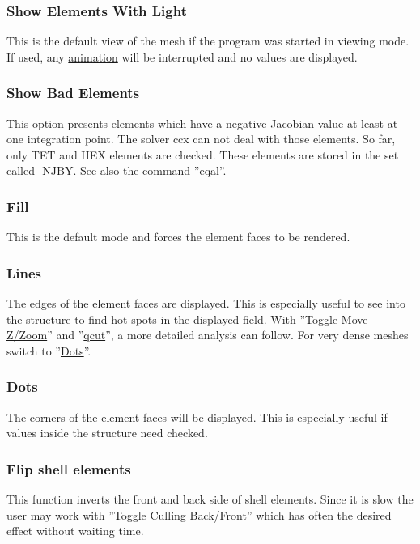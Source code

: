 \documentclass{article}
\providecommand{\htmlref}[2]{\hyperref[#2]{#1}}
\begin{document}
\subsubsection{\label{Show Elements With Light}Show Elements With Light}
This is the default view of the mesh if the program was started in viewing mode. If used, any \htmlref{animation}{animation} will be interrupted and no values are displayed.  

\subsubsection{\label{Show Bad Elements}Show Bad Elements}
This option presents elements which have a negative Jacobian value at least at one integration point. The solver ccx can not deal with those elements. So far, only TET and HEX elements are checked. These elements are stored in the set called -NJBY. See also the command ''\htmlref{eqal}{eqal}''.

\subsubsection{\label{Fill}Fill}
This is the default mode and forces the element faces to be rendered.

\subsubsection{\label{Lines}Lines}
The edges of the element faces are displayed. This is especially useful to see into the structure to find hot spots in the displayed field. With ''\htmlref{Toggle Move-Z/Zoom}{Toggle Move-Z/Zoom}'' and ''\htmlref{qcut}{qcut}'', a more detailed analysis can follow. For very dense meshes switch to ''\htmlref{Dots}{Dots}''.

\subsubsection{\label{Dots}Dots}
The corners of the element faces will be displayed. This is especially useful if values inside the structure need checked.

\subsubsection{\label{Flip shell elements}Flip shell elements}
This function inverts the front and back side of shell elements. Since it is slow the user may work with ''\htmlref{Toggle Culling Back/Front}{Toggle Culling Back/Front}'' which has often the desired effect without waiting time.
\end{document}
